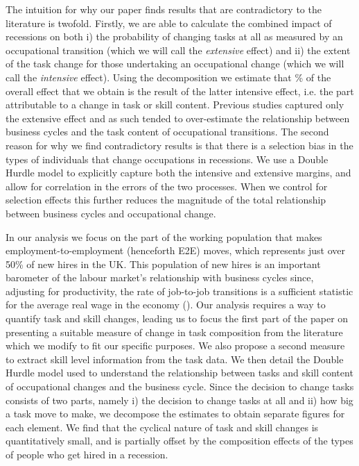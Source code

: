 \documentclass[11pt, oneside]{article}
\begin{document}
	
	


	\vspace{2mm}


\noindent The intuition for why our paper finds results that are contradictory to the literature is twofold.  Firstly, we are able to calculate the combined impact of recessions on both i) the probability of changing tasks at all as measured by an occupational transition (which we will call the \textit{extensive} effect) and ii) the extent of the task change for those undertaking an occupational change (which we will call the \textit{intensive} effect). Using the \cite{Mcdonald1980} decomposition we estimate that \hspace{-1mm}\% of the overall effect that we obtain is the result of the latter intensive effect, i.e. the part attributable to a change in task or skill content. Previous studies captured only the extensive effect and as such tended to over-estimate the relationship between business cycles and the task content of occupational transitions. The second reason for why we find contradictory results is that there is a selection bias in the types of individuals that change occupations in recessions. We use a Double Hurdle model to explicitly capture both the intensive and extensive margins, and allow for correlation in the errors of the two processes. When we control for selection effects this further reduces the magnitude of the total relationship between business cycles and occupational change.



	
	\vspace{2mm}
	
	In our analysis we focus on the part of the working population that makes employment-to-employment (henceforth E2E) moves, which represents just over 50\% of new hires in the UK. This population of new hires is an important barometer of the labour market's relationship with  business cycles since, adjusting for productivity, the rate of job-to-job transitions is a sufficient statistic for the average real wage in the economy (\cite{MoscariniPostelVinay}). Our analysis requires a way to quantify task and skill changes, leading us to focus the first part of the paper on presenting a suitable measure of change in task composition from the literature which we modify to fit our specific purposes. We also propose a second measure to extract skill level information from the task data. We then detail the Double Hurdle model used to understand the relationship between tasks and skill content of occupational changes and the business cycle. Since the decision to change tasks consists of two parts, namely i) the decision to change tasks at all and ii) how big a task move to make, we decompose the estimates to obtain separate figures for each element. We find that the cyclical nature of task and skill changes is quantitatively small, and is partially offset by the composition effects of the types of people who get hired in a recession. 
	
\end{document}
